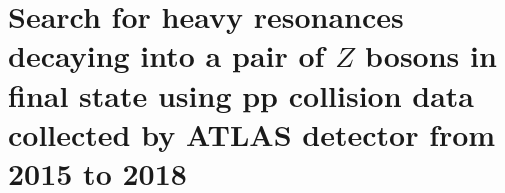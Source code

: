 \chapter{Search for heavy resonances decaying into a pair of $Z$ bosons in \llll final state using pp collision data collected by ATLAS detector from 2015 to 2018}








%

\clearpage

